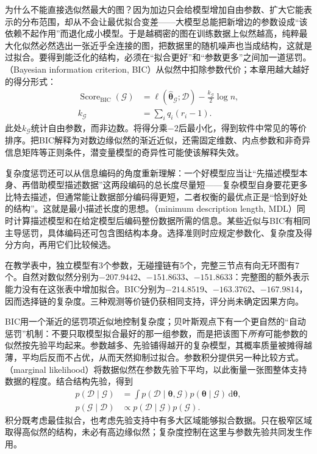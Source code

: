 为什么不能直接选似然最大的图？因为加边只会给模型增加自由参数、扩大它能表示的分布范围，却从不会让最优拟合变差——大模型总能把新增边的参数设成“该依赖不起作用”而退化成小模型。于是越稠密的图在训练数据上似然越高，纯粹最大化似然必然选出一张近乎全连接的图，把数据里的随机噪声也当成结构，这就是过拟合。要得到能泛化的结构，必须在“拟合更好”和“参数更多”之间加一道惩罚。（Bayesian information criterion, BIC）从似然中扣除参数代价；本章用越大越好的得分形式：
\begin{equation}
  \begin{aligned}
    \operatorname{Score}_{\mathrm{BIC}}(\mathcal{G})
      &=\ell(\widehat{\bm{\theta}}_{\mathcal{G}};\mathcal{D})
        -\frac{k_{\mathcal{G}}}{2}\log n,\\
    k_{\mathcal{G}}&=\sum_iq_i(r_i-1).
  \end{aligned}
  \label{eq:pgm-structure-learning-bic}
\end{equation}
此处$k_{\mathcal{G}}$统计自由参数，而非边数。将得分乘$-2$后最小化，得到软件中常见的等价排序。把BIC解释为对数边缘似然的渐近近似，还需固定维数、内点参数和非奇异信息矩阵等正则条件，潜变量模型的奇异性可能使该解释失效。

复杂度惩罚还可以从信息编码的角度重新理解：一个好模型应当让“先描述模型本身、再借助模型描述数据”这两段编码的总长度尽量短——复杂模型自身要花更多比特去描述，但通常能让数据部分编码得更短，二者权衡的最优点正是“恰到好处的结构”。这就是最小描述长度的思想。（minimum description length, MDL）同时计算描述模型和在给定模型后编码整份数据所需的信息。某些近似与BIC有相同主导惩罚，具体编码还可包含图结构本身。选择准则时应规定参数化、复杂度及得分方向，再用它们比较候选。

在教学表中，独立模型有3个参数，无碰撞链有5个，完整三节点有向无环图有7个。自然对数似然分别为$-207.9442$、$-151.8633$、$-151.8633$：完整图的额外表示能力没有在这张表中增加拟合。BIC分别为$-214.8519$、$-163.3762$、$-167.9814$，因而选择链的复杂度。三种观测等价链仍获相同支持，评分尚未确定因果方向。

BIC用一个渐近的惩罚项近似地控制复杂度；贝叶斯观点下有一个更自然的“自动惩罚”机制：不要只取模型拟合最好的那一组参数，而是把该图下\emph{所有}可能参数的似然按先验平均起来。参数越多、先验铺得越开的复杂模型，其概率质量被摊得越薄，平均后反而不占优，从而天然抑制过拟合。参数积分提供另一种比较方式。（marginal likelihood）将数据似然在参数先验下平均，以此衡量一张图整体支持数据的程度。结合结构先验，得到
\begin{equation}
  \begin{aligned}
    p(\mathcal{D}\mid\mathcal{G})
      &=\int p(\mathcal{D}\mid\bm{\theta},\mathcal{G})
              p(\bm{\theta}\mid\mathcal{G})\,\mathrm{d}\bm{\theta},\\
    p(\mathcal{G}\mid\mathcal{D})
      &\propto p(\mathcal{D}\mid\mathcal{G})p(\mathcal{G}).
  \end{aligned}
  \label{eq:pgm-structure-learning-posterior}
\end{equation}
积分既考虑最佳拟合，也考虑先验支持中有多大区域能够拟合数据。只在极窄区域取得高似然的结构，未必有高边缘似然；复杂度控制在这里与参数先验共同发生作用。

